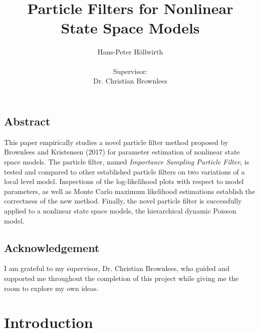 \documentclass[11pt, oneside]{scrreprt}   	%
\title{\textit{}\\\textit{}\\Particle Filters for Nonlinear\\ State Space Models}
\author{Hans-Peter H{\"o}llwirth \\  \\Supervisor: \\ Dr. Christian Brownlees}
\date{}
\begin{document}
\maketitle

\section*{Abstract}
This paper empirically studies a novel particle filter method proposed by Brownlees and Kristensen (2017) for parameter estimation of nonlinear state space models. 
The particle filter, named \textit{Importance Sampling Particle Filter}, is tested and compared to other established particle filters on two variations of a local level model. 
Inspections of the log-likelihood plots with respect to model parameters, as well as Monte Carlo maximum likelihood estimations establish the correctness of the new method.
Finally, the novel particle filter is successfully applied to a nonlinear state space models, the hierarchical dynamic Poisson model.

\vfill

\section*{Acknowledgement}
I am grateful to my supervisor, Dr. Christian Brownlees, who guided and supported me throughout the completion of this project while giving me the room to explore my own ideas.

\newpage
\setcounter{secnumdepth}{1}
\setcounter{tocdepth}{1}
\tableofcontents
\newpage

\chapter{Introduction}
\label{chp:introduction}
\end{document}
